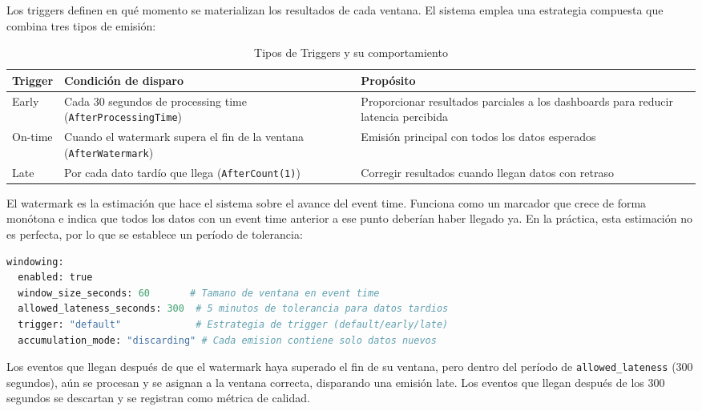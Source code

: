 \documentclass[12pt,a4paper]{article}
\begin{document}
Los triggers definen en qué momento se materializan los resultados de cada ventana. El sistema emplea una estrategia compuesta que combina tres tipos de emisión:

\begin{table}[H]
    \centering
    \caption{Tipos de Triggers y su comportamiento}
    \begin{tabular}{@{}lp{6cm}p{6cm}@{}}
        \toprule
        \textbf{Trigger} & \textbf{Condición de disparo}                                             & \textbf{Propósito}                                                                 \\
        \midrule
        Early            & Cada 30 segundos de processing time (\texttt{AfterProcessingTime})        & Proporcionar resultados parciales a los dashboards para reducir latencia percibida \\
        On-time          & Cuando el watermark supera el fin de la ventana (\texttt{AfterWatermark}) & Emisión principal con todos los datos esperados                                    \\
        Late             & Por cada dato tardío que llega (\texttt{AfterCount(1)})                   & Corregir resultados cuando llegan datos con retraso                                \\
        \bottomrule
    \end{tabular}
\end{table}

El watermark es la estimación que hace el sistema sobre el avance del event time. Funciona como un marcador que crece de forma monótona e indica que todos los datos con un event time anterior a ese punto deberían haber llegado ya. En la práctica, esta estimación no es perfecta, por lo que se establece un período de tolerancia:

\begin{lstlisting}[language=Python, caption=Configuración de windowing en config.yaml]
windowing:
  enabled: true
  window_size_seconds: 60       # Tamano de ventana en event time
  allowed_lateness_seconds: 300  # 5 minutos de tolerancia para datos tardios
  trigger: "default"             # Estrategia de trigger (default/early/late)
  accumulation_mode: "discarding" # Cada emision contiene solo datos nuevos
\end{lstlisting}

Los eventos que llegan después de que el watermark haya superado el fin de su ventana, pero dentro del período de \texttt{allowed\_lateness} (300 segundos), aún se procesan y se asignan a la ventana correcta, disparando una emisión late. Los eventos que llegan después de los 300 segundos se descartan y se registran como métrica de calidad.
\end{document}
